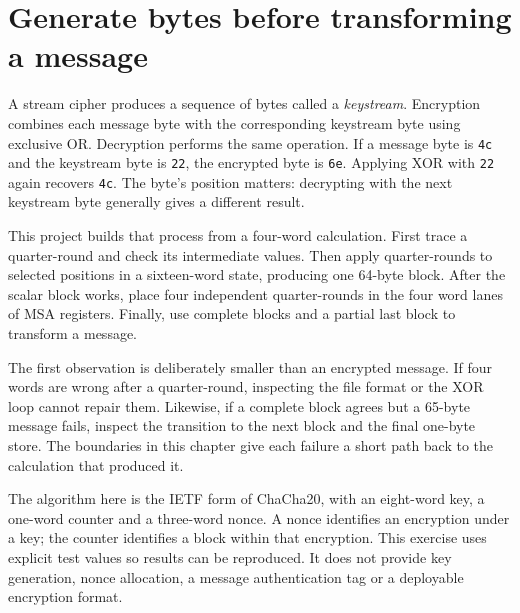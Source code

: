\section{Generate bytes before transforming a message}
A stream cipher produces a sequence of bytes called a \emph{keystream}. Encryption
combines each message byte with the corresponding keystream byte using exclusive OR.
Decryption performs the same operation. If a message byte is \texttt{4c} and the
keystream byte is \texttt{22}, the encrypted byte is \texttt{6e}. Applying XOR with
\texttt{22} again recovers \texttt{4c}. The byte's position matters: decrypting with
the next keystream byte generally gives a different result.

This project builds that process from a four-word calculation. First trace a
quarter-round and check its intermediate values. Then apply quarter-rounds to selected
positions in a sixteen-word state, producing one 64-byte block. After the scalar block
works, place four independent quarter-rounds in the four word lanes of MSA registers.
Finally, use complete blocks and a partial last block to transform a message.

The first observation is deliberately smaller than an encrypted message. If four
words are wrong after a quarter-round, inspecting the file format or the XOR loop
cannot repair them. Likewise, if a complete block agrees but a 65-byte message fails,
inspect the transition to the next block and the final one-byte store. The boundaries
in this chapter give each failure a short path back to the calculation that produced it.

The algorithm here is the IETF form of ChaCha20, with an eight-word key, a one-word
counter and a three-word nonce. A nonce identifies an encryption under a key; the
counter identifies a block within that encryption. This exercise uses explicit test
values so results can be reproduced. It does not provide key generation, nonce
allocation, a message authentication tag or a deployable encryption format.
